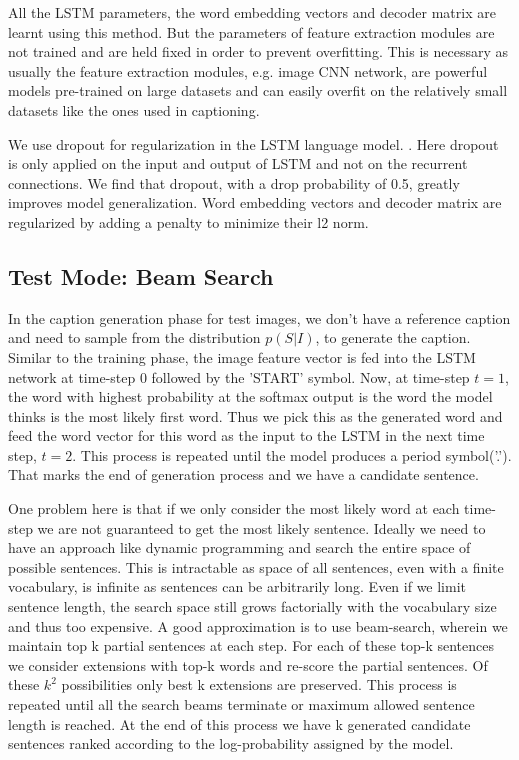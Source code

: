 All the LSTM parameters, the word embedding vectors and decoder matrix are
learnt using this method.
But the parameters of feature extraction modules are not trained and are held
fixed in order to prevent overfitting. 
This is necessary as usually the feature extraction modules, e.g. image CNN
network, are powerful models pre-trained on large datasets and can easily
overfit on the relatively small datasets like the ones used in captioning.

We use dropout for regularization in the LSTM language model.
\cite{ZarembaSV14}.
Here dropout is only applied on the input and output of LSTM and not on the
recurrent connections.
We find that dropout, with a drop probability of 0.5, greatly improves model
generalization.
Word embedding vectors and decoder matrix are regularized by adding a penalty to
minimize their l2 norm.

\subsection{Test Mode: Beam Search}
In the caption generation phase for test images, we don't have a reference
caption and need to sample from the distribution $p(S|I)$, to generate the
caption.
Similar to the training phase, the image feature vector is fed into the LSTM
network at time-step 0 followed by the 'START' symbol.
Now, at time-step $t=1$, the word with highest probability at the softmax output
is the word the model thinks is the most likely first word.
Thus we pick this as the generated word and feed the word vector for this word
as the input to the LSTM in the next time step, $t=2$.
This process is repeated until the model produces a period symbol('.').
That marks the end of generation process and we have a candidate sentence.

One problem here is that if we only consider the most likely word at each
time-step we are not guaranteed to get the most likely sentence.
Ideally we need to have an approach like dynamic programming and search the
entire space of possible sentences.
This is intractable as space of all sentences, even with a finite vocabulary, is
infinite as sentences can be arbitrarily long.
Even if we limit sentence length, the search space still grows factorially with
the vocabulary size and thus too expensive.
A good approximation is to use beam-search, wherein we maintain top k partial
sentences at each step.
For each of these top-k sentences we consider extensions with top-k words and
re-score the partial sentences.
Of these $k^2$ possibilities only best k extensions are preserved.
This process is repeated until all the search beams terminate or maximum allowed
sentence length is reached.
At the end of this process we have k generated candidate sentences ranked
according to the log-probability assigned by the model.

